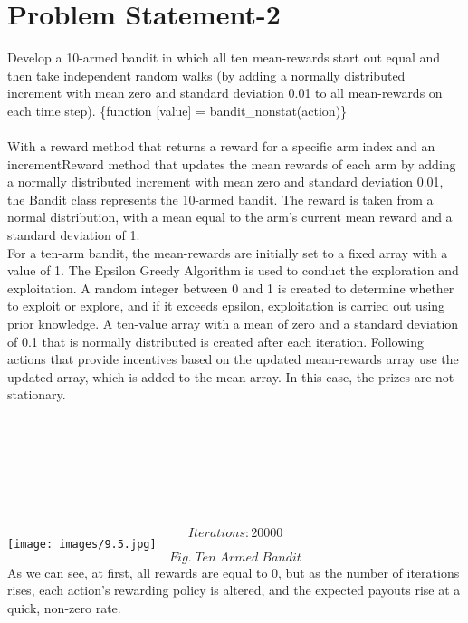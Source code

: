 \documentclass[conference]{IEEEtran}
\begin{document}
\section{Problem Statement-2} 
Develop a 10-armed bandit in which all ten mean-rewards start out equal and then take independent random walks (by adding a normally distributed increment with mean zero and standard deviation 0.01 to all mean-rewards on each time step). 
\{function [value] = bandit\_nonstat(action)\}\\ 
\\
With a reward method that returns a reward for a specific arm index and an incrementReward method that updates the mean rewards of each arm by adding a normally distributed increment with mean zero and standard deviation 0.01, the Bandit class represents the 10-armed bandit. The reward is taken from a normal distribution, with a mean equal to the arm's current mean reward and a standard deviation of 1.\\
For a ten-arm bandit, the mean-rewards are initially set to a fixed array with a value of 1. The Epsilon Greedy Algorithm is used to conduct the exploration and exploitation. A random integer between 0 and 1 is created to determine whether to exploit or explore, and if it exceeds epsilon, exploitation is carried out using prior knowledge. A ten-value array with a mean of zero and a standard deviation of 0.1 that is normally distributed is created after each iteration. Following actions that provide incentives based on the updated mean-rewards array use the updated array, which is added to the mean array. In this case, the prizes are not stationary.\\ \\ \\ \\ \\ \\ \\ \\
$$Iterations:20000$$
\texttt{[image: images/9.5.jpg]}
$$Fig. \; Ten \; Armed \; Bandit$$
As we can see, at first, all rewards are equal to 0, but as the number of iterations rises, each action's rewarding policy is altered, and the expected payouts rise at a quick, non-zero rate.\\
\end{document}
